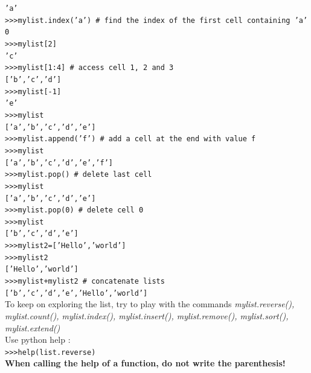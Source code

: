 \documentclass[article,10pt]{scrartcl}
\begin{document}
\texttt{'a'}\\
\texttt{>>>mylist.index('a') \# find the index of the first cell containing 'a'}\\
\texttt{0}\\
\texttt{>>>mylist[2]}\\
\texttt{'c'}\\
\texttt{>>>mylist[1:4] \# access cell 1, 2 and 3}\\
\texttt{['b','c','d']}\\
\texttt{>>>mylist[-1]}\\
\texttt{'e'}\\
\texttt{>>>mylist}\\
\texttt{['a','b','c','d','e']}\\
\texttt{>>>mylist.append('f') \# add a cell at the end with value f}\\
\texttt{>>>mylist}\\
\texttt{['a','b','c','d','e','f']}\\
\texttt{>>>mylist.pop() \# delete last cell}\\
\texttt{>>>mylist}\\
\texttt{['a','b','c','d','e']}\\
\texttt{>>>mylist.pop(0) \# delete cell 0}\\
\texttt{>>>mylist}\\
\texttt{['b','c','d','e']}\\
\texttt{>>>mylist2=['Hello','world']}\\
\texttt{>>>mylist2}\\
\texttt{['Hello','world']}\\
\texttt{>>>mylist+mylist2 \# concatenate lists}\\
\texttt{['b','c','d','e','Hello','world']}\\

To keep on exploring the list, try to play with the commands \textit{mylist.reverse(), mylist.count(), mylist.index(), mylist.insert(), mylist.remove(), mylist.sort(), mylist.extend()}\\
Use python help :\\
\texttt{>>>help(list.reverse)}\\
\textbf{When calling the help of a function, do not write the parenthesis!}
\end{document}
